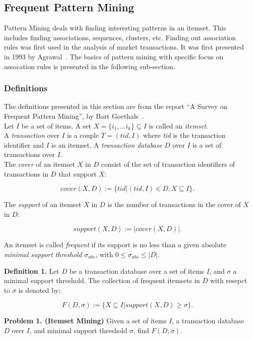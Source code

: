 \documentclass{article}
\begin{document}
\subsection{Frequent Pattern Mining}
Pattern Mining deals with finding interesting patterns in an itemset. This includes finding associations, sequences, clusters, etc. Finding out association rules was first used in the analysis of market transactions. It was first presented in 1993 by Agrawal~\cite{paper:agrawal}. The basics of pattern mining with specific focus on assocation rules is presented in the following sub-section.


\subsubsection{Definitions}
The definitions presented in this section are from the report ``A Survey on Frequent Pattern Mining'', by Bart Goethals~\cite{report:patternmining}.\\

Let $I$ be a set of items. A set $X = \{i_1, ... i_k\} \subseteq I$ is called an {\sl itemset}. \\

A {\sl transaction} over $I$ is a couple $T = (tid, I)$ where {\sl tid} is the transaction identifier and $I$ is an itemset. A {\sl transaction database} $D$ over $I$ is a set of transactions over $I$. \\

The {\sl cover} of an itemset $X$ in $D$ consist of the set of transaction identifiers of transactions in $D$ that support $X$:

\[cover(X, D) := \{tid | (tid, I) \in D, X \subseteq I\}. \]

The {\sl support} of an itemset $X$ in $D$ is the number of transactions in the cover of $X$ in $D$:

\[support(X, D) := |cover(X,D)|.\]

An itemset is called {\sl frequent} if its support is no less than a given absolute {\sl minimal support threshold $\sigma_{abs}$}, with  $0 \le \sigma_{abs} \le |D|$.

{\bf Definition 1.} Let $D$ be a transaction database over a set of items $I$, and $\sigma$ a minimal support threshold. The collection of frequent itemsets in $D$ with resepct to $\sigma$ is denoted by: 

\[F(D,\sigma) := \{X \subseteq I | support(X, D) \ge \sigma\}.\]

{\bf Problem 1. (Itemset Mining)} Given a set of items $I$, a transaction database $D$ over $I$, and minimal support threshold $\sigma$, find $F(D, \sigma)$.\\
\end{document}
